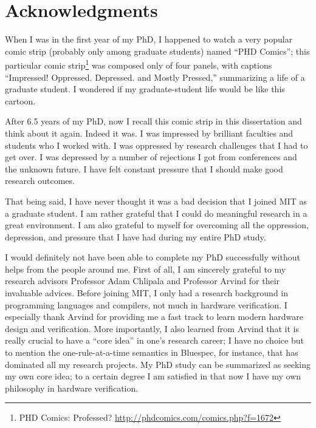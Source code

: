 % 

\cleardoublepage

\section*{Acknowledgments}

When I was in the first year of my PhD, I happened to watch a very popular comic strip (probably only among graduate students) named ``PHD Comics''; this particular comic strip\footnote{PHD Comics: Professed? \url{http://phdcomics.com/comics.php?f=1672}} was composed only of four panels, with captions ``Impressed! Oppressed. Depressed. and Mostly Pressed,'' summarizing a life of a graduate student.
I wondered if my graduate-student life would be like this cartoon.

After 6.5 years of my PhD, now I recall this comic strip in this dissertation and think about it again.
Indeed it was.
I was impressed by brilliant faculties and students who I worked with.
I was oppressed by research challenges that I had to get over.
I was depressed by a number of rejections I got from conferences and the unknown future.
I have felt constant pressure that I should make good research outcomes.

That being said, I have never thought it was a bad decision that I joined MIT as a graduate student.
I am rather grateful that I could do meaningful research in a great environment.
I am also grateful to myself for overcoming all the oppression, depression, and pressure that I have had during my entire PhD study.

I would definitely not have been able to complete my PhD successfully without helps from the people around me.
First of all, I am sincerely grateful to my research advisors Professor Adam Chlipala and Professor Arvind for their invaluable advices.
Before joining MIT, I only had a research background in programming languages and compilers, not much in hardware verification.
I especially thank Arvind for providing me a fast track to learn modern hardware design and verification.
More importantly, I also learned from Arvind that it is really crucial to have a ``core idea'' in one's research career; I have no choice but to mention the one-rule-at-a-time semantics in Bluespec, for instance, that has dominated all my research projects.
My PhD study can be summarized as seeking my own core idea; to a certain degree I am satisfied in that now I have my own philosophy in hardware verification.

